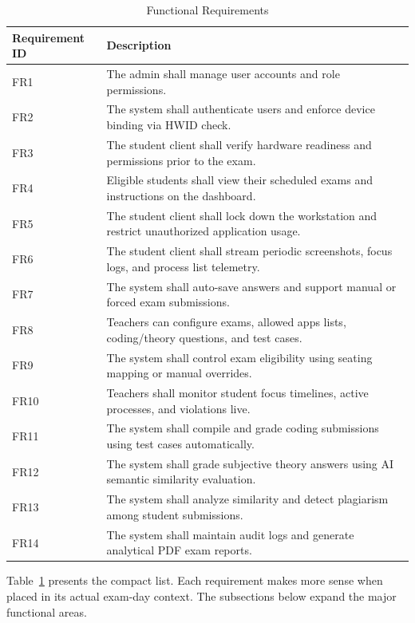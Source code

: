 \begin{table}[H]
\centering
\caption{Functional Requirements}
\label{tab:functionalrequirements}
\renewcommand{\arraystretch}{1.2}
\begin{tabular}{lp{10.6cm}}
\hline\hline
\textbf{Requirement ID} & \textbf{Description} \\
\hline\hline
FR1 & The admin shall manage user accounts and role permissions. \\
FR2 & The system shall authenticate users and enforce device binding via HWID check. \\
FR3 & The student client shall verify hardware readiness and permissions prior to the exam. \\
FR4 & Eligible students shall view their scheduled exams and instructions on the dashboard. \\
FR5 & The student client shall lock down the workstation and restrict unauthorized application usage. \\
FR6 & The student client shall stream periodic screenshots, focus logs, and process list telemetry. \\
FR7 & The system shall auto-save answers and support manual or forced exam submissions. \\
FR8 & Teachers can configure exams, allowed apps lists, coding/theory questions, and test cases. \\
FR9 & The system shall control exam eligibility using seating mapping or manual overrides. \\
FR10 & Teachers shall monitor student focus timelines, active processes, and violations live. \\
FR11 & The system shall compile and grade coding submissions using test cases automatically. \\
FR12 & The system shall grade subjective theory answers using AI semantic similarity evaluation. \\
FR13 & The system shall analyze similarity and detect plagiarism among student submissions. \\
FR14 & The system shall maintain audit logs and generate analytical PDF exam reports. \\
\hline\hline
\end{tabular}
\end{table}

Table~\ref{tab:functionalrequirements} presents the compact list. Each requirement makes more sense when placed in its actual exam-day context. The subsections below expand the major functional areas.

